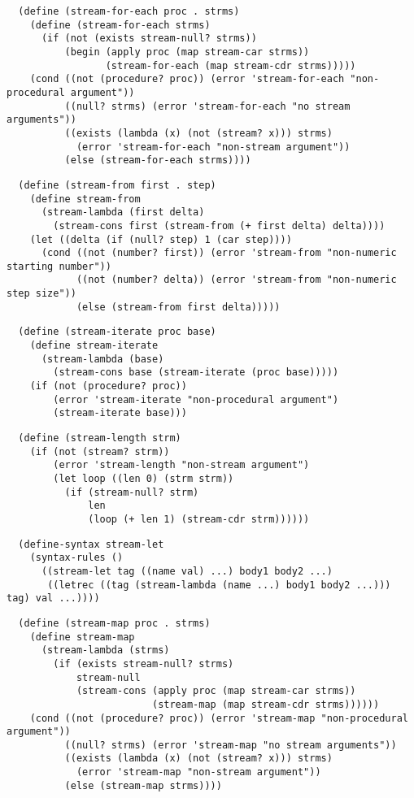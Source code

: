 \begin{verbatim}
  (define (stream-for-each proc . strms)
    (define (stream-for-each strms)
      (if (not (exists stream-null? strms))
          (begin (apply proc (map stream-car strms))
                 (stream-for-each (map stream-cdr strms)))))
    (cond ((not (procedure? proc)) (error 'stream-for-each "non-procedural argument"))
          ((null? strms) (error 'stream-for-each "no stream arguments"))
          ((exists (lambda (x) (not (stream? x))) strms)
            (error 'stream-for-each "non-stream argument"))
          (else (stream-for-each strms))))
\end{verbatim}

\begin{verbatim}
  (define (stream-from first . step)
    (define stream-from
      (stream-lambda (first delta)
        (stream-cons first (stream-from (+ first delta) delta))))
    (let ((delta (if (null? step) 1 (car step))))
      (cond ((not (number? first)) (error 'stream-from "non-numeric starting number"))
            ((not (number? delta)) (error 'stream-from "non-numeric step size"))
            (else (stream-from first delta)))))
\end{verbatim}

\begin{verbatim}
  (define (stream-iterate proc base)
    (define stream-iterate
      (stream-lambda (base)
        (stream-cons base (stream-iterate (proc base)))))
    (if (not (procedure? proc))
        (error 'stream-iterate "non-procedural argument")
        (stream-iterate base)))
\end{verbatim}

\begin{verbatim}
  (define (stream-length strm)
    (if (not (stream? strm))
        (error 'stream-length "non-stream argument")
        (let loop ((len 0) (strm strm))
          (if (stream-null? strm)
              len
              (loop (+ len 1) (stream-cdr strm))))))
\end{verbatim}

\begin{verbatim}
  (define-syntax stream-let
    (syntax-rules ()
      ((stream-let tag ((name val) ...) body1 body2 ...)
       ((letrec ((tag (stream-lambda (name ...) body1 body2 ...))) tag) val ...))))
\end{verbatim}

\begin{verbatim}
  (define (stream-map proc . strms)
    (define stream-map
      (stream-lambda (strms)
        (if (exists stream-null? strms)
            stream-null
            (stream-cons (apply proc (map stream-car strms))
                         (stream-map (map stream-cdr strms))))))
    (cond ((not (procedure? proc)) (error 'stream-map "non-procedural argument"))
          ((null? strms) (error 'stream-map "no stream arguments"))
          ((exists (lambda (x) (not (stream? x))) strms)
            (error 'stream-map "non-stream argument"))
          (else (stream-map strms))))
\end{verbatim}

